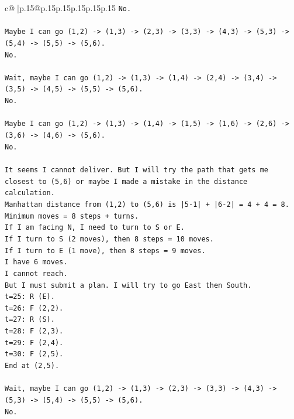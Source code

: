 \documentclass{article}
\begin{document}
{\begin{supertabular}{c@{$\;$}|p{.15\linewidth}@{}p{.15\linewidth}p{.15\linewidth}p{.15\linewidth}p{.15\linewidth}p{.15\linewidth}}
{{{\texttt{No.} \\
\\ 
\texttt{Maybe I can go (1,2) {-}> (1,3) {-}> (2,3) {-}> (3,3) {-}> (4,3) {-}> (5,3) {-}> (5,4) {-}> (5,5) {-}> (5,6).} \\
\texttt{No.} \\
\\ 
\texttt{Wait, maybe I can go (1,2) {-}> (1,3) {-}> (1,4) {-}> (2,4) {-}> (3,4) {-}> (3,5) {-}> (4,5) {-}> (5,5) {-}> (5,6).} \\
\texttt{No.} \\
\\ 
\texttt{Maybe I can go (1,2) {-}> (1,3) {-}> (1,4) {-}> (1,5) {-}> (1,6) {-}> (2,6) {-}> (3,6) {-}> (4,6) {-}> (5,6).} \\
\texttt{No.} \\
\\ 
\texttt{It seems I cannot deliver. But I will try the path that gets me closest to (5,6) or maybe I made a mistake in the distance calculation.} \\
\texttt{Manhattan distance from (1,2) to (5,6) is |5{-}1| + |6{-}2| = 4 + 4 = 8.} \\
\texttt{Minimum moves = 8 steps + turns.} \\
\texttt{If I am facing N, I need to turn to S or E.} \\
\texttt{If I turn to S (2 moves), then 8 steps = 10 moves.} \\
\texttt{If I turn to E (1 move), then 8 steps = 9 moves.} \\
\texttt{I have 6 moves.} \\
\texttt{I cannot reach.} \\
\texttt{But I must submit a plan. I will try to go East then South.} \\
\texttt{t=25: R (E).} \\
\texttt{t=26: F (2,2).} \\
\texttt{t=27: R (S).} \\
\texttt{t=28: F (2,3).} \\
\texttt{t=29: F (2,4).} \\
\texttt{t=30: F (2,5).} \\
\texttt{End at (2,5).} \\
\\ 
\texttt{Wait, maybe I can go (1,2) {-}> (1,3) {-}> (2,3) {-}> (3,3) {-}> (4,3) {-}> (5,3) {-}> (5,4) {-}> (5,5) {-}> (5,6).} \\
\texttt{No.} \\
\\ 
}}}
\end{supertabular}}
\end{document}
